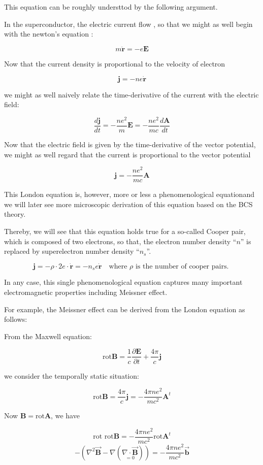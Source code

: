 This equation can be roughly understtod by the following argument. 

In the superconductor, the electric current flow {}, so that we might as well begin with the newton's equation {}: 

\[m\ddot{\bm{r}} = -e\bm{E} \]

Now that the current density is proportional to the velocity of electron

\[\bm{j} = -ne\dot{\bm{r}} \]

we might as well naively relate the time-derivative of the current with the electric field: 

\[\frac{d\bm{j}}{dt} = -\frac{ne^2}{m}\bm{E} = -\frac{ne^2}{mc}\frac{d\bm{A}}{dt} \]

Now that the electric field is given by the time-derivative of the vector potential, we might as well regard that the current is proportional to the vector potential

\[\bm{j} = -\frac{ne^2}{mc}\bm{A} \]

This London equation is, however, more or less a phenomenological equationand we will later see more microscopic derivation of this equation based on the BCS theory. 

Thereby, we will see that this equation holds true for a so-called Cooper pair, which is composed of two electrons, so that, the electron number density ``$n$'' is replaced by superelectron number density ``$n_s$''. 

\[\bm{j} = -\rho\cdot 2e \cdot\dot{\bm{r}} = -n_s e \dot{\bm{r}}\quad \text{where $\rho$ is the number of cooper pairs. } \]

In any case, this single phenomenological equation captures many important electromagnetic properties including Meissner effect. 

For example, the Meissner effect can be derived from the London equation as follows: 

From the Maxwell equation: 

\[\text{rot} \bm{B} = \frac{1}{c}\frac{\partial \bm{E}}{\partial t} + \frac{4\pi}{c}\bm{j} \]

we consider the temporally static situation: 

\[\text{rot}\bm{B} = \frac{4\pi}{c}\bm{j} = -\frac{4\pi ne^2}{mc^2}\bm{A}^t \]

Now $\bm{B} = \text{rot}\bm{A}$, we have

\[\text{rot\ rot}\bm{B} = -\frac{4\pi ne^2}{mc^2}\text{rot}\bm{A}^t \]
\[-\left(\nabla^2\vec{\bm{B}} - \nabla (\underset{=0}{\nabla \cdot \vec{\bm{B}}})\right) = -\frac{4\pi ne^2}{mc^2}\vec{\bm{b}} \]

